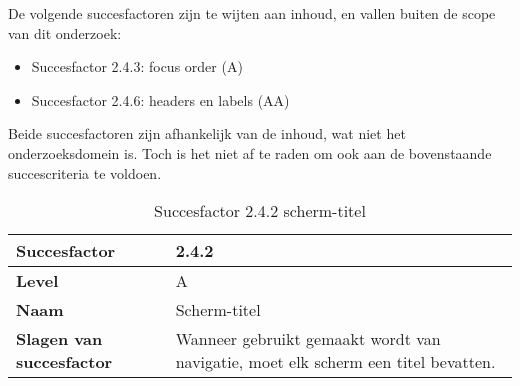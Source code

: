 De volgende succesfactoren zijn te wijten aan inhoud, en vallen buiten de scope van dit onderzoek: 
\begin{itemize}
            \item Succesfactor 2.4.3: focus order (A)
    \item Succesfactor 2.4.6: headers en labels (AA)
    
\end{itemize}
Beide succesfactoren zijn afhankelijk van de inhoud, wat niet het onderzoeksdomein is. Toch is het niet af te raden om ook aan de bovenstaande succescriteria te voldoen. 
\begin{table}[H]
    \centering
    \caption{Succesfactor 2.4.2 scherm-titel}
    
    
    \hspace*{-1cm}\begin{tabular}{|l|p{12cm}|} 
        \hline
        \textbf{Succesfactor}                 & 2.4.2                                                                                                                                                                                                                                                                                                                                                                                                                                                                                                          \\ 
        \hline
        \textbf{Level}                        & A                                                                                                                                                                                                                                                                                                                                                                                                                                                                                                                 \\ 
        \hline
        \textbf{Naam}                         & Scherm-titel~                                                                                                                                                                                                                                                                                                                                                                                                                                                                                      \\ 
        \hline
        \textbf{Slagen van succesfactor}      & Wanneer gebruikt gemaakt wordt van navigatie, moet elk scherm een titel bevatten.                                                                                                                                  \\ 
     

\end{tabular}
\end{table}
